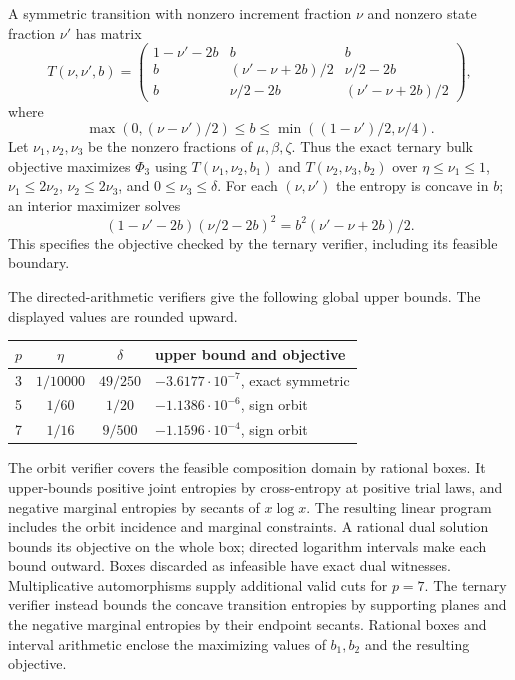A symmetric transition with nonzero increment fraction $\nu$ and nonzero
state fraction $\nu'$ has matrix
\[
 T(\nu,\nu',b)=
 \begin{pmatrix}
 1-\nu'-2b&b&b\\
 b&(\nu'-\nu+2b)/2&\nu/2-2b\\
 b&\nu/2-2b&(\nu'-\nu+2b)/2
 \end{pmatrix},
\]
where
\[
 \max(0,(\nu-\nu')/2)\le b\le\min((1-\nu')/2,\nu/4).
\]
Let $\nu_1,\nu_2,\nu_3$ be the nonzero fractions of $\mu,\beta,\zeta$.
Thus the exact ternary bulk objective maximizes
$\Phi_3$ using $T(\nu_1,\nu_2,b_1)$ and $T(\nu_2,\nu_3,b_2)$ over
$\eta\le\nu_1\le1$, $\nu_1\le2\nu_2$, $\nu_2\le2\nu_3$, and
$0\le\nu_3\le\delta$.
For each $(\nu,\nu')$ the entropy is concave in $b$; an interior maximizer
solves
\[
 (1-\nu'-2b)(\nu/2-2b)^2=b^2(\nu'-\nu+2b)/2.
\]
This specifies the objective checked by the ternary verifier, including
its feasible boundary.

The directed-arithmetic verifiers give the following global upper bounds.
The displayed values are rounded upward.
\begin{center}
\begin{tabular}{@{}cccl@{}}
\toprule
$p$ & $\eta$ & $\delta$ & upper bound and objective \\
\midrule
3 & $1/10000$ & $49/250$ & $-3.6177\cdot10^{-7}$, exact symmetric \\
5 & $1/60$ & $1/20$ & $-1.1386\cdot10^{-6}$, sign orbit \\
7 & $1/16$ & $9/500$ & $-1.1596\cdot10^{-4}$, sign orbit \\
\bottomrule
\end{tabular}
\end{center}
The orbit verifier covers the feasible composition domain by rational boxes.
It upper-bounds positive joint entropies by cross-entropy at positive trial
laws, and negative marginal entropies by secants of $x\log x$.
The resulting linear program includes the orbit incidence and marginal
constraints. A rational dual solution bounds its objective on the whole box;
directed logarithm intervals make each bound outward. Boxes discarded as
infeasible have exact dual witnesses. Multiplicative automorphisms supply
additional valid cuts for $p=7$. The ternary verifier instead bounds the
concave transition entropies by supporting planes and the negative marginal
entropies by their endpoint secants. Rational boxes and interval arithmetic
enclose the maximizing values of $b_1,b_2$ and the resulting objective.

